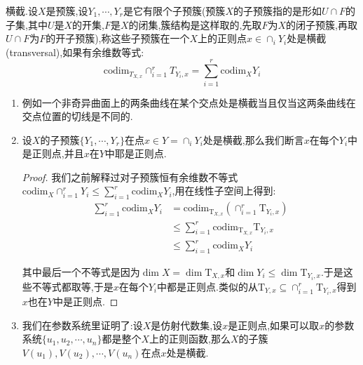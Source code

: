横截.设$X$是预簇,设$Y_1,\cdots,Y_r$是它有限个子预簇(预簇$X$的子预簇指的是形如$U\cap F$的子集,其中$U$是$X$的开集,$F$是$X$的闭集,簇结构是这样取的,先取$F$为$X$的闭子预簇,再取$U\cap F$为$F$的开子预簇),称这些子预簇在一个$X$上的正则点$x\in\cap_iY_i$处是横截(transversal),如果有余维数等式:
$$\mathrm{codim}_{T_{X,x}}\cap_{i=1}^rT_{Y_i,x}=\sum_{i=1}^r\mathrm{codim}_XY_i$$
\begin{enumerate}
	\item 例如一个非奇异曲面上的两条曲线在某个交点处是横截当且仅当这两条曲线在交点位置的切线是不同的.
	\item 设$X$的子预簇$\{Y_1,\cdots,Y_r\}$在点$x\in Y=\cap_iY_i$处是横截,那么我们断言$x$在每个$Y_i$中是正则点,并且$x$在$Y$中耶是正则点.
	\begin{proof}
		
		我们之前解释过对子预簇恒有余维数不等式$\mathrm{codim}_X\cap_{i=1}^rY_i\le\sum_{i=1}^r\mathrm{codim}_XY_i$,用在线性子空间上得到:
		\begin{align*}
			\sum_{i=1}^r\mathrm{codim}_XY_i&=\mathrm{codim}_{\mathrm{T}_{X,x}}\left(\cap_{i=1}^r\mathrm{T}_{Y_i,x}\right)\\&\le\sum_{i=1}^r\mathrm{codim}_{\mathrm{T}_{X,x}}\mathrm{T}_{Y_i,x}\\&\le\sum_{i=1}^r\mathrm{codim}_XY_i
		\end{align*}
		
		其中最后一个不等式是因为$\dim X=\dim\mathrm{T}_{X,x}$和$\dim Y_i\le\dim\mathrm{T}_{Y_i,x}$.于是这些不等式都取等,于是$x$在每个$Y_i$中都是正则点.类似的从$\mathrm{T}_{Y,x}\subseteq\cap_{i=1}^r\mathrm{T}_{Y_i,x}$得到$x$也在$Y$中是正则点.
	\end{proof}
	\item 我们在参数系统里证明了:设$X$是仿射代数集,设$x$是正则点,如果可以取$x$的参数系统$\{u_1,u_2,\cdots,u_n\}$都是整个$X$上的正则函数,那么$X$的子簇$V(u_1),V(u_2),\cdots,V(u_n)$在点$x$处是横截.
\end{enumerate}

